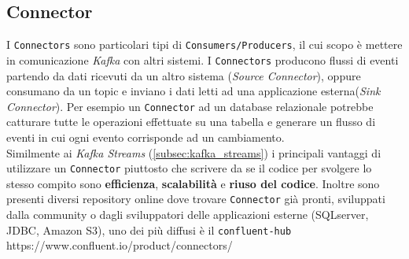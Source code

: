 \subsection{Connector}
\label{subsec:kafka_connectors}
I \texttt{Connectors} sono particolari tipi di \texttt{Consumers/Producers}, il cui scopo è mettere in comunicazione \textit{Kafka} con altri sistemi.
I \texttt{Connectors} producono flussi di eventi partendo da dati ricevuti da un altro sistema (\textit{Source Connector}), oppure consumano da un topic e inviano i dati letti ad una applicazione esterna(\textit{Sink Connector}).
Per esempio un \texttt{Connector} ad un database relazionale potrebbe catturare tutte le operazioni effettuate su una tabella e generare un flusso di eventi in cui ogni evento corrisponde ad un cambiamento.\\
Similmente ai \textit{Kafka Streams} (\ref{subsec:kafka_streams}) i principali vantaggi di utilizzare un \texttt{Connector} piuttosto che scrivere da se il codice per svolgere lo stesso compito sono
\textbf{efficienza}, \textbf{scalabilità} e \textbf{riuso del codice}.
Inoltre sono presenti diversi repository online dove trovare \texttt{Connector} già pronti, sviluppati dalla community o dagli sviluppatori delle applicazioni esterne (SQLserver, JDBC, Amazon S3),
uno dei più diffusi è il \texttt{confluent-hub} https://www.confluent.io/product/connectors/ 

\newpage
